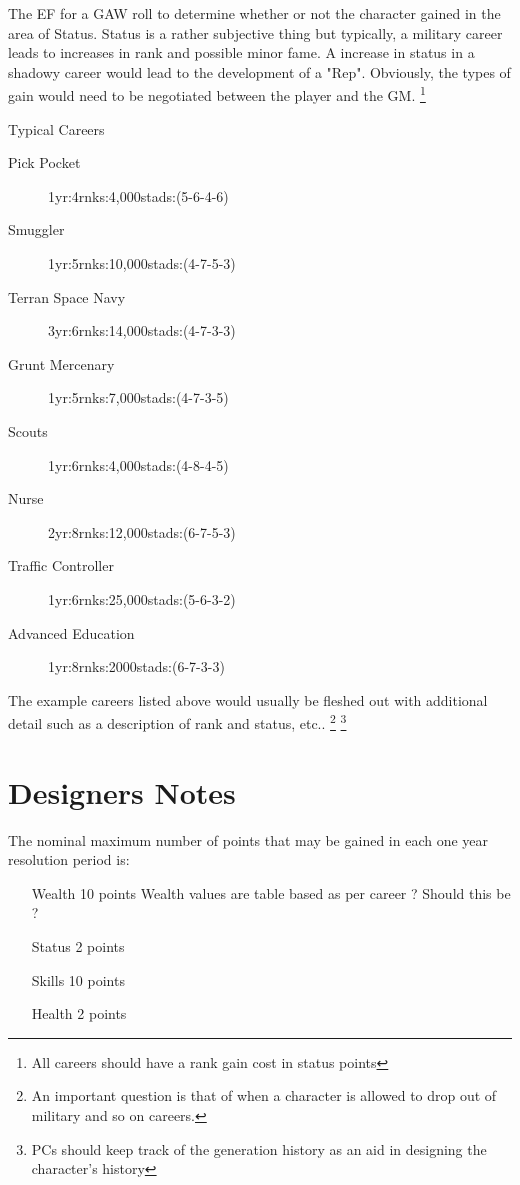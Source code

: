 \begin{description}
	\item[Status]
	The EF for a GAW roll to determine whether or not the character
	gained in the area of Status. Status is a rather subjective thing
	but typically, a military career leads to increases in rank and
	possible minor fame. A increase in status in a shadowy career would
	lead to the development of a "Rep". Obviously, the types of gain would
	need to be negotiated between the player and the GM. 
	\footnote{All careers should have a rank gain cost in status 
	points}
	\item Typical Careers
	\begin{description}
		\item[Pick Pocket]
		1yr:4rnks:4,000stads:(5-6-4-6) 
		\item[Smuggler]
		1yr:5rnks:10,000stads:(4-7-5-3)
		\item[Terran Space Navy]
		3yr:6rnks:14,000stads:(4-7-3-3)
		\item[Grunt Mercenary]
		1yr:5rnks:7,000stads:(4-7-3-5)
		\item[Scouts]
		1yr:6rnks:4,000stads:(4-8-4-5)
		\item[Nurse]
		2yr:8rnks:12,000stads:(6-7-5-3)
		\item[Traffic Controller]
		1yr:6rnks:25,000stads:(5-6-3-2)
		\item[Advanced Education]
		1yr:8rnks:2000stads:(6-7-3-3)
	\end{description}
\end{description}

The example careers listed above would usually be fleshed out with 
additional detail such as a description of rank and status, etc..
\footnote{An important question is that of when a character is
allowed to drop out of military and so on careers.}
\footnote{PCs should keep track of the generation history as an aid 
in designing the character's history}

\section{Designers Notes}

The nominal maximum number of points that may be gained in each one 
year resolution period is:

\begin{itemize}
	\item[Wealth] 10 points
    Wealth values are table based as per career ? Should this be ?
	\item[Status] 2 points
	\item[Skills] 10 points
	\item[Health] 2 points
\end{itemize}
